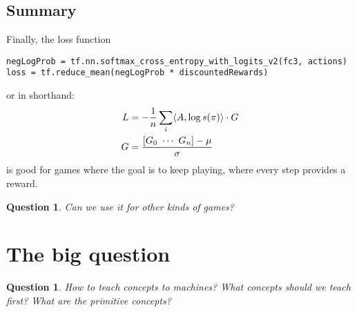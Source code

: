 \documentclass[10pt]{article}
\theoremstyle{plain}
\newtheorem{question}[theorem]{Question}
\theoremstyle{definition}
\theoremstyle{remark}
\renewcommand\frac[2]{\genfrac{}{}{0.5pt}{}{#1}{#2}}
\newcommand{\0}{\varnothing}
\newcommand{\m}{\mu}
\newcommand{\s}{\sigma}
\newcommand{\<}{\langle}
\renewcommand{\>}{\rangle}
\begin{document}
\subsection{Summary}

Finally, the loss function

\scriptsize
\begin{lstlisting}
negLogProb = tf.nn.softmax_cross_entropy_with_logits_v2(fc3, actions)
loss = tf.reduce_mean(negLogProb * discountedRewards)
\end{lstlisting}
\normalsize
or in shorthand:
\begin{align*}
L &= - \frac{1}{n} \sum_{i} \< A, \log s(\pi) \> \cdot G \\
G &= \frac{[G_0 \ \cdots \ G_n] - \m}{\s}
\end{align*}
is good for games where the goal is to keep playing, where every step provides a reward.

\begin{question}
Can we use it for other kinds of games?
\end{question}

\section{The big question}

\begin{question}
How to teach concepts to machines? What concepts should we teach first? What are the primitive concepts?
\end{question}
\end{document}
